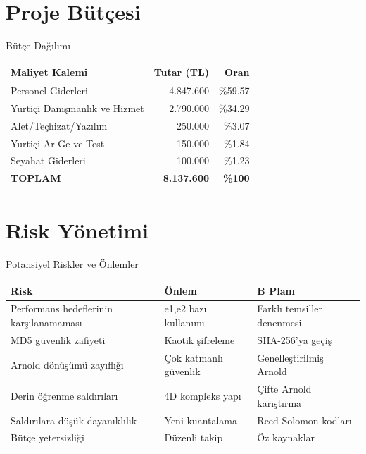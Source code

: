\documentclass[aspectratio=169,xcolor={dvipsnames}]{beamer}
\begin{document}
\section{Proje Bütçesi}

\begin{frame}{Bütçe Dağılımı}
\begin{table}
\centering
\small
\begin{tabular}{lrr}
\toprule
\textbf{Maliyet Kalemi} & \textbf{Tutar (TL)} & \textbf{Oran} \\
\midrule
Personel Giderleri & 4.847.600 & \%59.57 \\
Yurtiçi Danışmanlık ve Hizmet & 2.790.000 & \%34.29 \\
Alet/Teçhizat/Yazılım & 250.000 & \%3.07 \\
Yurtiçi Ar-Ge ve Test & 150.000 & \%1.84 \\
Seyahat Giderleri & 100.000 & \%1.23 \\
\midrule
\textbf{TOPLAM} & \textbf{8.137.600} & \textbf{\%100} \\
\bottomrule
\end{tabular}
\end{table}

\vspace{0.3cm}

\end{frame}

\section{Risk Yönetimi}

\begin{frame}{Potansiyel Riskler ve Önlemler}
\begin{table}
\centering
\tiny
\begin{tabular}{p{4cm}p{4cm}p{4cm}}
\toprule
\textbf{Risk} & \textbf{Önlem} & \textbf{B Planı} \\
\midrule
Performans hedeflerinin karşılanamaması & e1,e2 bazı kullanımı & Farklı temsiller denenmesi \\
MD5 güvenlik zafiyeti & Kaotik şifreleme & SHA-256'ya geçiş \\
Arnold dönüşümü zayıflığı & Çok katmanlı güvenlik & Genelleştirilmiş Arnold \\
Derin öğrenme saldırıları & 4D kompleks yapı & Çifte Arnold karıştırma \\
Saldırılara düşük dayanıklılık & Yeni kuantalama & Reed-Solomon kodları \\
Bütçe yetersizliği & Düzenli takip & Öz kaynaklar \\
\bottomrule
\end{tabular}
\end{table}
\end{frame}
\end{document}
